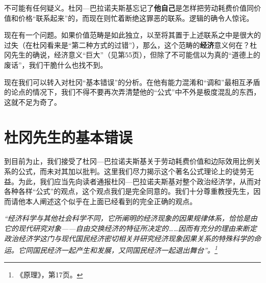 \documentclass[fontset=fandol, a4paper, 12pt, openright]{ctexbook}
\renewenvironment{quote}
  {\list{}{\rightmargin\leftmargin}%
   \item\relax\small\itshape\color{darkgray}}
  {\endlist}
\begin{document}
不可能有任何疑义。杜冈—巴拉诺夫斯基忘记了\textbf{他自己}是怎样把劳动耗费价值同价值和价格“联系起来”的，而现在则忙着断绝这罪恶的联系。逻辑的确令人惊诧。

现在有一个问题。如果价值范畴是如此独立，以至将其置于上述联系之中是很大的过失（在杜冈看来是“第二种方式的过错”），那么，这个范畴的\textbf{经济}意义何在？杜冈先生的确说，经济意义“巨大”（见第55页），但除了不可能信以为真的“道德上的废话”，我们干脆什么也找不到。

现在我们可以转入对杜冈“基本错误”的分析。在他有能力混淆和“调和”最相互矛盾的论点的情况下，我们不得不要再次弄清楚他的“公式”中不外是极度混乱的东西，这就不足为奇了。

\section{杜冈先生的基本错误}

到目前为止，我们接受了杜冈—巴拉诺夫斯基关于劳动耗费价值和边际效用比例关系的公式，而未对其加以批判。这里我们尽力揭示这个著名公式理论上的徒劳无益。为此，我们应当先向读者通报杜冈—巴拉诺夫斯基对整个政治经济学，从而对各种各样“公式”的观点，这个观点我们是完全同意的。我们十分尊重教授先生，因而请他本人阐述这个似乎在上面已经看到的完全正确的观点。

\begin{quote}
“经济科学与其他社会科学不同，它所阐明的经济现象的因果规律体系，恰恰是由它的现代研究对象——自由交换经济的特征所决定的……因而有充分的理由来断定政治经济学这门与现代国民经济密切相关并研究经济现象因果关系的特殊科学的命运。它同国民经济一起产生和发展，又同国民经济一起退出舞台”。\footnote{《原理》，第17页。}
\end{quote}
\end{document}
